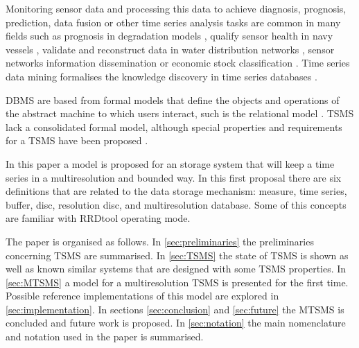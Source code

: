 Monitoring sensor data and processing this data to achieve diagnosis,
prognosis, prediction, data fusion or other time series analysis tasks are common in many fields such as prognosis in degradation models \parencite{yu11}, qualify sensor health in navy vessels \parencite{palmer07}, validate and reconstruct data in water distribution networks \parencite{quevedo10}, sensor networks information dissemination \parencite{deligiannakis07} or economic stock classification \parencite{dreyer95}. Time series data mining formalises the knowledge discovery in time series databases \parencite{last01}. 


DBMS are based from formal models that define the objects and
operations of the abstract machine to which users interact, such is
the relational model \parencite{date}. TSMS lack a consolidated formal
model, although special properties and requirements for a TSMS
have been proposed \parencite{dreyer94}.

In this paper
a model is proposed for an storage system that will keep a time series
in a multiresolution and bounded way.  In this first proposal there
are six definitions that are related to the data storage mechanism:
measure, time series, buffer, disc, resolution disc, and multiresolution
database. Some of this concepts are familiar with RRDtool
operating mode.


The paper is organised as follows. In \autoref{sec:preliminaries} the preliminaries concerning TSMS are summarised. In \autoref{sec:TSMS} the state of TSMS is shown as well as known similar systems that are designed with some TSMS properties. In \autoref{sec:MTSMS} a model for a multiresolution TSMS is presented for the first time. Possible reference implementations of this model are explored in \autoref{sec:implementation}. In sections \ref{sec:conclusion} and \ref{sec:future}  the MTSMS is concluded and future work is proposed. In \autoref{sec:notation} the main nomenclature and notation used in the paper is summarised. 




